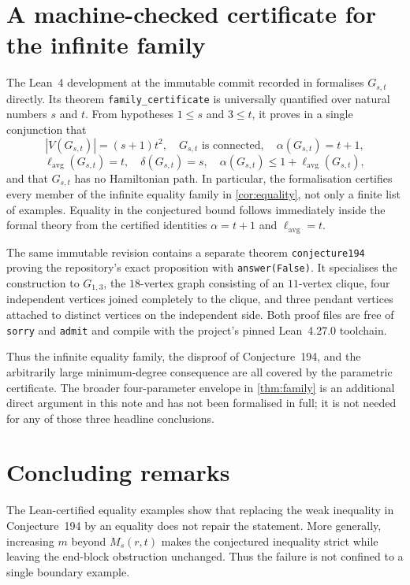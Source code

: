 \documentclass[11pt]{article}
\newcommand{\lavg}{\ell_{\mathrm{avg}}}
\begin{document}
\section{A machine-checked certificate for the infinite family}\label{sec:lean}

The Lean~4 development at the immutable commit recorded in
\cite{formalconjectures194} formalises $G_{s,t}$ directly.  Its theorem
\texttt{family\_certificate} is universally quantified over natural numbers $s$ and $t$.
From hypotheses $1\leq s$ and $3\leq t$, it proves in a single conjunction that
\[
  |V(G_{s,t})|=(s+1)t^2,\quad G_{s,t}\text{ is connected},\quad
  \alpha(G_{s,t})=t+1,
\]
\[
  \lavg(G_{s,t})=t,\quad \delta(G_{s,t})=s,\quad
  \alpha(G_{s,t})\leq 1+\lavg(G_{s,t}),
\]
and that $G_{s,t}$ has no Hamiltonian path.  In particular, the formalisation certifies
every member of the infinite equality family in \cref{cor:equality}, not only a finite
list of examples.  Equality in the conjectured bound follows immediately inside the
formal theory from the certified identities $\alpha=t+1$ and $\lavg=t$.

The same immutable revision contains a separate theorem \texttt{conjecture194} proving
the repository's exact proposition with \texttt{answer(False)}.  It specialises the
construction to $G_{1,3}$, the $18$-vertex graph consisting of an $11$-vertex clique,
four independent vertices joined completely to the clique, and three pendant vertices
attached to distinct vertices on the independent side.  Both proof files are free of
\texttt{sorry} and \texttt{admit} and compile with the project's pinned Lean~4.27.0
toolchain.

Thus the infinite equality family, the disproof of Conjecture~194, and the arbitrarily
large minimum-degree consequence are all covered by the parametric certificate.  The
broader four-parameter envelope in \cref{thm:family} is an additional direct argument in
this note and has not been formalised in full; it is not needed for any of those three
headline conclusions.

\section{Concluding remarks}

The Lean-certified equality examples show that replacing the weak inequality in
Conjecture~194 by an equality does not repair the statement.  More generally, increasing
$m$ beyond $M_s(r,t)$ makes the conjectured inequality strict while leaving the end-block
obstruction unchanged.  Thus the failure is not confined to a single boundary example.
\end{document}
